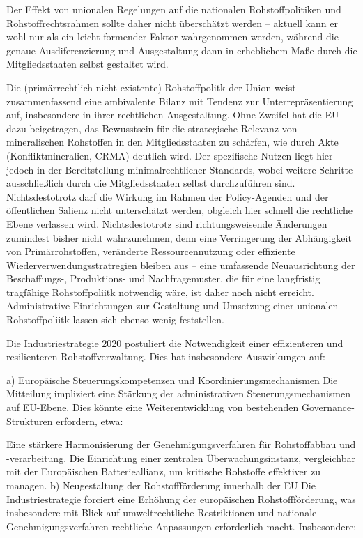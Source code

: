 \documentclass[12pt,a4paper,oneside]{book} %
\begin{document}
Der Effekt von unionalen Regelungen auf die nationalen Rohstoffpolitiken und Rohstoffrechtsrahmen sollte daher nicht überschätzt werden -- aktuell kann er wohl nur als ein leicht formender Faktor wahrgenommen werden, während die genaue Ausdiferenzierung und Ausgestaltung dann in erheblichem Maße durch die Mitgliedsstaaten selbst gestaltet wird.

Die (primärrechtlich nicht existente) Rohstoffpolitk der Union weist zusammenfassend eine ambivalente Bilanz mit Tendenz zur Unterrepräsentierung auf, insbesondere in ihrer rechtlichen Ausgestaltung. Ohne Zweifel hat die EU dazu beigetragen, das Bewusstsein für die strategische Relevanz von mineralischen Rohstoffen in den Mitgliedsstaaten zu schärfen, wie durch Akte (Konfliktmineralien, CRMA) deutlich wird. Der spezifische Nutzen liegt hier jedoch in der Bereitstellung minimalrechtlicher Standards, wobei weitere Schritte ausschließlich durch die Mitgliedsstaaten selbst durchzuführen sind. Nichtsdestotrotz darf die Wirkung im Rahmen der Policy-Agenden und der öffentlichen Salienz nicht unterschätzt werden, obgleich hier schnell die rechtliche Ebene verlassen wird. Nichtsdestotrotz sind richtungsweisende Änderungen zumindest bisher nicht wahrzunehmen, denn eine Verringerung der Abhängigkeit von Primärrohstoffen, veränderte Ressourcennutzung oder effiziente Wiederverwendungsstratregien bleiben aus -- eine umfassende Neuausrichtung der Beschaffungs-, Produktions- und Nachfragemuster, die für eine langfristig tragfähige Rohstoffpoliitk notwendig wäre, ist daher noch nicht erreicht. Administrative Einrichtungen zur Gestaltung und Umsetzung einer unionalen Rohstoffpoliitk lassen sich ebenso wenig feststellen.

Die Industriestrategie 2020 postuliert die Notwendigkeit einer effizienteren und resilienteren Rohstoffverwaltung. Dies hat insbesondere Auswirkungen auf:

a) Europäische Steuerungskompetenzen und Koordinierungsmechanismen
Die Mitteilung impliziert eine Stärkung der administrativen Steuerungsmechanismen auf EU-Ebene. Dies könnte eine Weiterentwicklung von bestehenden Governance-Strukturen erfordern, etwa:

Eine stärkere Harmonisierung der Genehmigungsverfahren für Rohstoffabbau und -verarbeitung.
Die Einrichtung einer zentralen Überwachungsinstanz, vergleichbar mit der Europäischen Batterieallianz, um kritische Rohstoffe effektiver zu managen.
b) Neugestaltung der Rohstoffförderung innerhalb der EU
Die Industriestrategie forciert eine Erhöhung der europäischen Rohstoffförderung, was insbesondere mit Blick auf umweltrechtliche Restriktionen und nationale Genehmigungsverfahren rechtliche Anpassungen erforderlich macht. Insbesondere:
\end{document}
